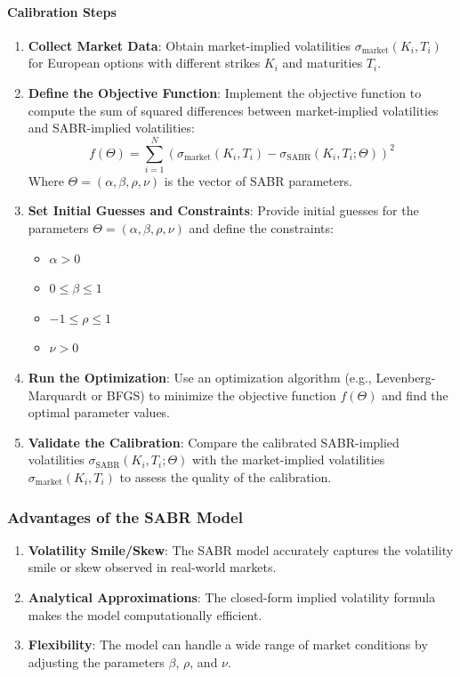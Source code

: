 \documentclass[11pt, oneside, a4paper, titlepage]{report}
\begin{document}
\paragraph{Calibration Steps}
\begin{enumerate}
    \item \textbf{Collect Market Data}:
    Obtain market-implied volatilities \( \sigma_{\text{market}}(K_i, T_i) \) for European options with different strikes \( K_i \) and maturities \( T_i \).
    \item \textbf{Define the Objective Function}:
    Implement the objective function to compute the sum of squared differences between market-implied volatilities and SABR-implied volatilities:
    \[
    f(\Theta) = \sum_{i=1}^N \left( \sigma_{\text{market}}(K_i, T_i) - \sigma_{\text{SABR}}(K_i, T_i; \Theta) \right)^2
    \]
    Where \( \Theta = (\alpha, \beta, \rho, \nu) \) is the vector of SABR parameters.
    \item \textbf{Set Initial Guesses and Constraints}:
    Provide initial guesses for the parameters \( \Theta = (\alpha, \beta, \rho, \nu) \) and define the constraints:
    \begin{itemize}
        \item \( \alpha > 0 \)
        \item \( 0 \leq \beta \leq 1 \)
        \item \( -1 \leq \rho \leq 1 \)
        \item \( \nu > 0 \)
    \end{itemize}
    \item \textbf{Run the Optimization}:
    Use an optimization algorithm (e.g., Levenberg-Marquardt or BFGS) to minimize the objective function \( f(\Theta) \) and find the optimal parameter values.
    \item \textbf{Validate the Calibration}:
    Compare the calibrated SABR-implied volatilities \( \sigma_{\text{SABR}}(K_i, T_i; \Theta) \) with the market-implied volatilities \( \sigma_{\text{market}}(K_i, T_i) \) to assess the quality of the calibration.
\end{enumerate}

\subsubsection{Advantages of the SABR Model}

\begin{enumerate}
    \item \textbf{Volatility Smile/Skew}: The SABR model accurately captures the volatility smile or skew observed in real-world markets.
    \item \textbf{Analytical Approximations}: The closed-form implied volatility formula makes the model computationally efficient.
    \item \textbf{Flexibility}: The model can handle a wide range of market conditions by adjusting the parameters \( \beta \), \( \rho \), and \( \nu \).
\end{enumerate}
\end{document}
